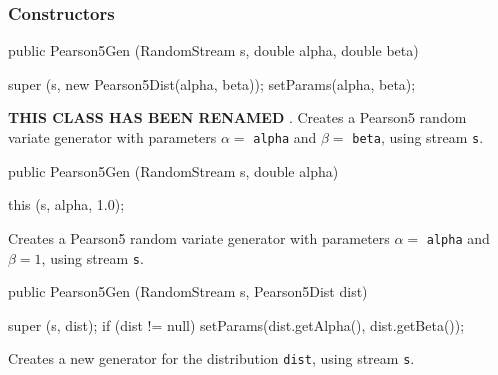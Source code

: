 \subsubsection* {Constructors}
\begin{code}

   public Pearson5Gen (RandomStream s, double alpha, double beta) \begin{hide} {
      super (s, new Pearson5Dist(alpha, beta));
      setParams(alpha, beta);
   }\end{hide}
\end{code}
\begin{tabb}\textbf{THIS CLASS HAS BEEN RENAMED }.
 Creates a Pearson5 random variate generator with parameters
  $\alpha =$ \texttt{alpha} and $\beta =$ \texttt{beta}, using stream \texttt{s}.
\end{tabb}
\begin{code}

   public Pearson5Gen (RandomStream s, double alpha) \begin{hide} {
      this (s, alpha, 1.0);
   }\end{hide}
\end{code}
\begin{tabb} Creates a Pearson5 random variate generator with parameters
 $\alpha =$ \texttt{alpha} and $\beta = 1$, using stream \texttt{s}.
\end{tabb}
\begin{code}

   public Pearson5Gen (RandomStream s, Pearson5Dist dist) \begin{hide} {
      super (s, dist);
      if (dist != null)
         setParams(dist.getAlpha(), dist.getBeta());
   }\end{hide}
\end{code}
\begin{tabb} Creates a new generator for the distribution \texttt{dist},
   using stream \texttt{s}.
\end{tabb}

